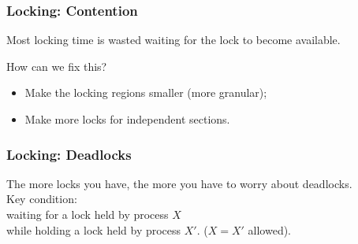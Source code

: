\documentclass[aspectratio=43]{beamer}
\newenvironment{changemargin}[1]{%
  \begin{list}{}{%
    \setlength{\topsep}{0pt}%
    \setlength{\leftmargin}{#1}%
    \setlength{\rightmargin}{1em}
    \setlength{\listparindent}{\parindent}%
    \setlength{\itemindent}{\parindent}%
    \setlength{\parsep}{\parskip}%
  }%
  \item[]}{\end{list}}
\begin{document}
\begin{frame}
  \frametitle{Locking: Contention}

  \begin{changemargin}{1cm}
    Most locking time is wasted waiting for the lock to become available.

    How can we fix this?
      \begin{itemize}
        \item Make the locking regions smaller (more granular);
        \item Make more locks for independent sections.
      \end{itemize}
  \end{changemargin}
\end{frame}

\begin{frame}
  \frametitle{Locking: Deadlocks}

  \begin{changemargin}{1cm}
  The more locks you have, the more you have to worry about deadlocks.\\[1em]

  Key condition: \\ 
\qquad waiting for a lock held by process $X$ \\while holding
a lock held by process $X'$. ($X = X'$ allowed).
  \end{changemargin}

\end{frame}
\end{document}
